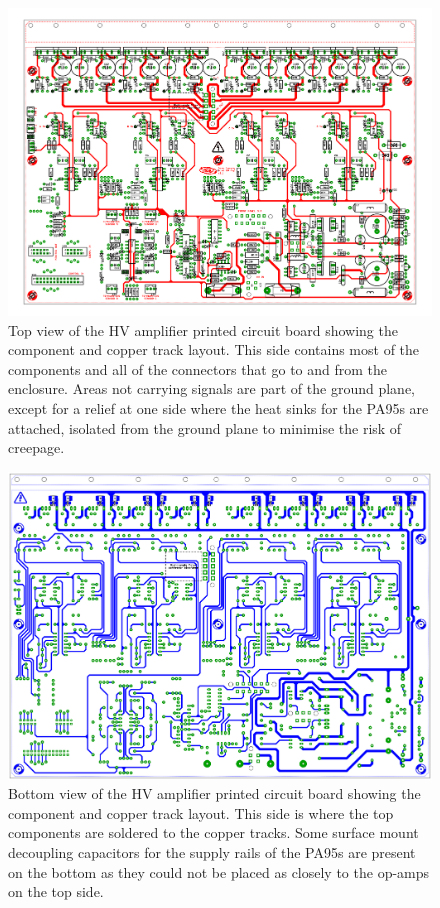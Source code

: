 \begin{figure}
  \includegraphics[width=\textwidth]{graphics/60-hv-amp-top.pdf}
  \caption[High voltage amplifier board, top view]{\label{fig:hv-amp-top}Top view of the \gls{HV} amplifier printed circuit board showing the component and copper track layout. This side contains most of the components and all of the connectors that go to and from the enclosure. Areas not carrying signals are part of the ground plane, except for a relief at one side where the heat sinks for the PA95s are attached, isolated from the ground plane to minimise the risk of creepage.}
\end{figure}

\begin{figure}
  \includegraphics[width=\textwidth]{graphics/60-hv-amp-bottom.pdf}
  \caption[High voltage amplifier board, bottom view]{\label{fig:hv-amp-bottom}Bottom view of the \gls{HV} amplifier printed circuit board showing the component and copper track layout. This side is where the top components are soldered to the copper tracks. Some surface mount decoupling capacitors for the supply rails of the PA95s are present on the bottom as they could not be placed as closely to the op-amps on the top side.}
\end{figure}